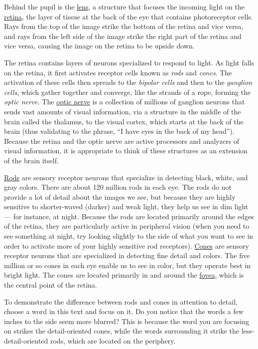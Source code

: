\documentclass[
]{krantz}
\begin{document}
Behind the pupil is the \hyperref[lens]{lens}, a structure that focuses the incoming light on the \hyperref[retina]{retina}, the layer of tissue at the back of the eye that contains photoreceptor cells. Rays from the top of the image strike the bottom of the retina and vice versa, and rays from the left side of the image strike the right part of the retina and vice versa, causing the image on the retina to be upside down.

The retina contains layers of neurons specialized to respond to light. As light falls on the retina, it first activates receptor cells known as \emph{rods} and \emph{cones}. The activation of these cells then spreads to the \emph{bipolar cells} and then to the \emph{ganglion cells}, which gather together and converge, like the strands of a rope, forming the \emph{optic nerve}. The \hyperref[optic-nerve]{optic nerve} is a collection of millions of ganglion neurons that sends vast amounts of visual information, via a structure in the middle of the brain called the thalamus, to the visual cortex, which starts at the back of the brain (thus validating to the phrase, ``I have eyes in the back of my head''). Because the retina and the optic nerve are active processors and analyzers of visual information, it is appropriate to think of these structures as an extension of the brain itself.

\hyperref[rods]{Rods} are sensory receptor neurons that specialize in detecting black, white, and gray colors. There are about 120 million rods in each eye. The rods do not provide a lot of detail about the images we see, but because they are highly sensitive to shorter-waved (darker) and weak light, they help us see in dim light --- for instance, at night. Because the rods are located primarily around the edges of the retina, they are particularly active in peripheral vision (when you need to see something at night, try looking slightly to the side of what you want to see in order to activate more of your highly sensitive rod receptors). \hyperref[cones]{Cones} are sensory receptor neurons that are specialized in detecting fine detail and colors. The five million or so cones in each eye enable us to see in color, but they operate best in bright light. The cones are located primarily in and around the \hyperref[fovea]{fovea}, which is the central point of the retina.

To demonstrate the difference between rods and cones in attention to detail, choose a word in this text and focus on it. Do you notice that the words a few inches to the side seem more blurred? This is because the word you are focusing on strikes the detail-oriented cones, while the words surrounding it strike the less-detail-oriented rods, which are located on the periphery.
\end{document}
